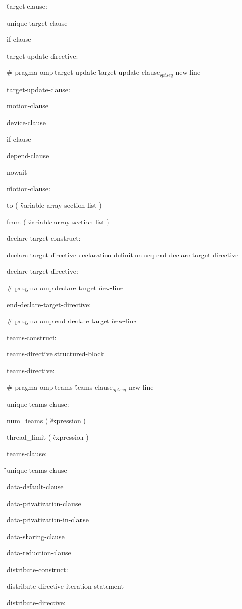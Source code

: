 {\G target-clause:

\I unique-target-clause

\I if-clause

target-update-directive:

\C\I \# pragma omp target update \G target-update-clause$_{optseq}$ new-line

target-update-clause:

\I motion-clause

\I device-clause

\I if-clause

\I depend-clause

\C\I nowait

\G motion-clause:

\C\I to ( \G variable-array-section-list \C )

\C\I from ( \G variable-array-section-list \C )

\G declare-target-construct:

\I declare-target-directive declaration-definition-seq end-declare-target-directive

declare-target-directive:

\C\I \# pragma omp declare target \G new-line

end-declare-target-directive:

\C\I \# pragma omp end declare target \G new-line

teams-construct:

\I teams-directive structured-block

teams-directive:

\C\I \# pragma omp teams \G teams-clause$_{optseq}$ new-line

unique-teams-clause:

\C\I num\_teams ( \G expression \C )

\C\I thread\_limit ( \G expression \C )

teams-clause:

\G\I unique-teams-clause

\I data-default-clause

\I data-privatization-clause

\I data-privatization-in-clause

\I data-sharing-clause

\I data-reduction-clause

distribute-construct:

\I distribute-directive iteration-statement

distribute-directive:

}
